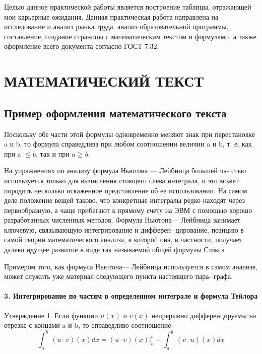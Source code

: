 \documentclass[14pt]{extreport}
\begin{document}
\pagestyle{empty} %


\pagestyle{plain} %
\tableofcontents
 



\intro\label{intro}



Целью данное практической работы является построение таблицы, отражающей мои карьерные ожидания. Данная практическая работа направлена на исследование и анализ рынка труда, анализ образовательной программы, составление, создание страницы с математическим текстом и формулами, а также оформление всего документа согласно ГОСТ 7.32.


\chapter{МАТЕМАТИЧЕСКИЙ ТЕКСТ\label{chapter1}}
\section{Пример оформления математического текста}

Поскольку обе части этой формулы одновременно меняют знак при перестановке a и b, то формула справедлива при любом соотношении величин a и b,
т. е. как при a $\leq b$, так и при $a \geq b$.

На упражнениях по анализу формула Ньютона — Лейбница большей ча-
стью используется только для вычисления стоящего слева интеграла, и это
может породить несколько искаженное представление об ее использовании.
На самом деле положение вещей таково, что конкретные интегралы редко
находят через первообразную, а чаще прибегают к прямому счету на ЭВМ
с помощью хорошо разработанных численных методов. Формула Ньютона—
Лейбница занимает ключевую, связывающую интегрирование и дифферен-
цирование, позицию в самой теории математического анализа, в которой
она, в частности, получает далеко идущее развитие в виде так называемой
общей формулы Стокса

Примером того, как формула Ньютона— Лейбница используется в самом
анализе, может служить уже материал следующего пункта настоящего пара-
графа.

\subsubsection{3. Интегрирование по частям в определенном интеграле и формула Тейлора}

Утверждение 1. Если функции $u(x)$ и $v(x)$ непрерывно дифференцируемы
на отрезке с концами a и b, то справедливо соотношение \\
\begin{equation}
	\int_{a}^{b}  \,(u\cdot v)(x)dx=(u \cdot v)(x)| _a^b - \int_{a}^{b} \, (v \cdot u) (x) dx
\end{equation}
\end{document}
